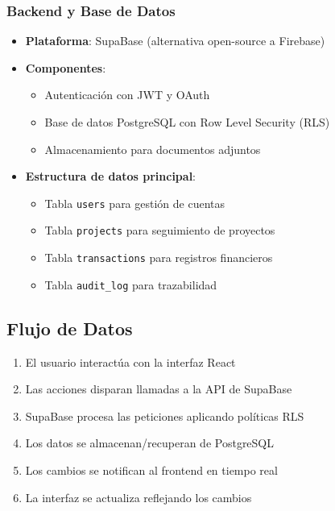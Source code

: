 \subsubsection*{Backend y Base de Datos}
\begin{itemize}
    \item \textbf{Plataforma}: SupaBase (alternativa open-source a Firebase)
    \item \textbf{Componentes}:
    \begin{itemize}
        \item Autenticación con JWT y OAuth
        \item Base de datos PostgreSQL con Row Level Security (RLS)
        \item Almacenamiento para documentos adjuntos
    \end{itemize}
    \item \textbf{Estructura de datos principal}:
    \begin{itemize}
        \item Tabla \texttt{users} para gestión de cuentas
        \item Tabla \texttt{projects} para seguimiento de proyectos
        \item Tabla \texttt{transactions} para registros financieros
        \item Tabla \texttt{audit\_log} para trazabilidad
    \end{itemize}
\end{itemize}

\subsection*{Flujo de Datos}
\begin{enumerate}
    \item El usuario interactúa con la interfaz React
    \item Las acciones disparan llamadas a la API de SupaBase
    \item SupaBase procesa las peticiones aplicando políticas RLS
    \item Los datos se almacenan/recuperan de PostgreSQL
    \item Los cambios se notifican al frontend en tiempo real
    \item La interfaz se actualiza reflejando los cambios
\end{enumerate}

